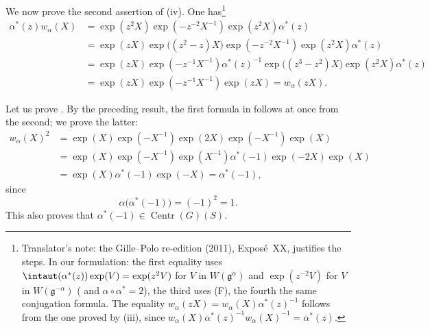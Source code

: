 We now prove the second assertion of \textup{(iv)}. One has\footnote{Translator's note: the Gille--Polo re-edition (2011), Exposé~XX, justifies
the steps. In our formulation: the first equality uses \(\intaut(\alpha^\ast(z))\exp(V)=\exp(z^2V)\)
for \(V\) in \(W(\mathfrak g^\alpha)\) and \(\exp(z^{-2}V)\) for \(V\) in \(W(\mathfrak g^{-\alpha})\)
\textup{( and \(\alpha\circ\alpha^\ast=2\))}, the third uses \textup{(F)},
the fourth the same conjugation formula. The equality \(w_\alpha(zX)=w_\alpha(X)\alpha^\ast(z)^{-1}\)
follows from the one proved by \textup{(iii)}, since
\(w_\alpha(X)\alpha^\ast(z)^{-1}w_\alpha(X)^{-1}=\alpha^\ast(z)\).}%
\[
\begin{aligned}
  \alpha^\ast(z)w_\alpha(X)
    &={}\exp(z^2X)\exp(-z^{-2}X^{-1})
       \exp(z^2X)\alpha^\ast(z)\\
    &={}\exp(zX)\exp\bigl((z^2-z)X\bigr)
       \exp(-z^{-2}X^{-1})\exp(z^2X)\alpha^\ast(z)\\
    &={}\exp(zX)\exp(-z^{-1}X^{-1})\alpha^\ast(z)^{-1}
       \exp\bigl((z^3-z^2)X\bigr)\exp(z^2X)\alpha^\ast(z)\\
    &={}\exp(zX)\exp(-z^{-1}X^{-1})\exp(zX)
       =w_\alpha(zX).
\end{aligned}
\]

Let us prove \textup{}. By the preceding result, the first
formula in \textup{} follows at once from the second; we prove
the latter:
\[
\begin{aligned}
  w_\alpha(X)^2
    &={}\exp(X)\exp(-X^{-1})\exp(2X)\exp(-X^{-1})\exp(X)\\
    &={}\exp(X)\exp(-X^{-1})\exp(X^{-1})
       \alpha^\ast(-1)\exp(-2X)\exp(X)\\
    &={}\exp(X)\alpha^\ast(-1)\exp(-X)
       =\alpha^\ast(-1),
\end{aligned}
\]
since
\[
  \alpha\bigl(\alpha^\ast(-1)\bigr)=(-1)^2=1.
\]
This also proves that
\(\alpha^\ast(-1)\in\operatorname{Centr}(G)(S)\).

